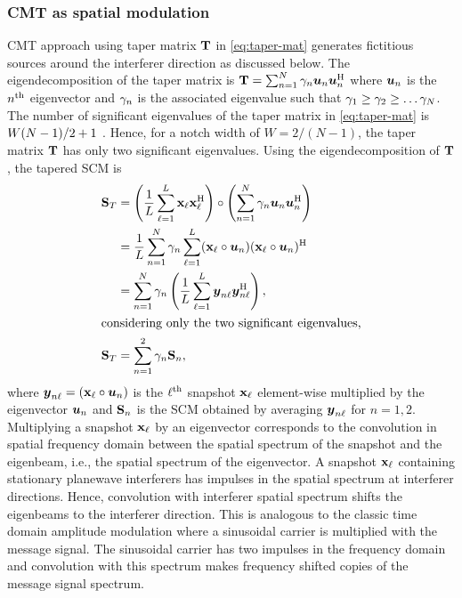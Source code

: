\subsubsection{CMT as spatial modulation}
\label{sec:cmt-as-spatial}
CMT approach using taper matrix $\mathbf{T}$ in \eqref{eq:taper-mat}
generates fictitious sources around the interferer direction as
discussed below. The eigendecomposition of the taper matrix is
$\mathbf{T} = \sum_{n=1}^{N}\gamma_n\boldsymbol{u}_n\boldsymbol{u}_n^{\rm H}$ where
$\boldsymbol{u}_n$ is the $n^{\rm th}$ eigenvector and $\gamma_n$ is the
associated eigenvalue such that
$\gamma_1 \geq \gamma_2 \geq \ldots \gamma_N$. The number of significant
eigenvalues of the taper matrix in \eqref{eq:taper-mat} is
$W(N-1)/2 + 1$ \cite{song2003null}. Hence, for a notch width of
$W = 2/(N-1)$, the taper matrix $\mathbf{T}$ has only two significant
eigenvalues. Using the eigendecomposition of $\mathbf{T}$, the tapered
SCM is
\begin{align*}
  {\bf S}_{T} &= \left( \frac{1}{L}\sum\limits_{\ell = 1}^{L}{\bf x}_{\ell}{\bf x}_{\ell}^{\rm H} \right) \circ \left( \sum\limits_{n=1}^{N}\gamma_n\boldsymbol{u}_n\boldsymbol{u}_n^{\rm H} \right)\\
 \
 &= \frac{1}{L}\sum\limits_{n=1}^{N}\gamma_n\sum\limits_{\ell = 1}^{L}({\bf x}_{\ell}\circ\boldsymbol{u}_n)({\bf x}_{\ell}\circ\boldsymbol{u}_n)^{\rm H}\\
               &=
               \sum\limits_{n=1}^{N}\gamma_n\left(\frac{1}{L}\sum\limits_{\ell
                 = 1}^{L}\boldsymbol{y}_{n\ell}\boldsymbol{y}_{n\ell}^{\rm H} \right ), \\
\intertext{considering only the two significant eigenvalues,}
{\bf S}_{T}  &= \sum\limits_{n=1}^{2}\gamma_n{\bf S}_n,
\end{align*}
where $\boldsymbol{y}_{n\ell} = ({\bf x}_{\ell}\circ\boldsymbol{u}_n)$ is the
$\ell^{\rm th}$ snapshot ${\bf x}_{\ell}$ element-wise multiplied by the
eigenvector $\boldsymbol{u}_n$ and ${\bf S}_n$ is the SCM obtained by
averaging $\boldsymbol{y}_{n\ell}$ for $n = 1, 2$. Multiplying a snapshot
${\bf x}_{\ell}$ by an eigenvector corresponds to the convolution in
spatial frequency domain between the spatial spectrum of the snapshot
and the eigenbeam, i.e., the spatial spectrum of the eigenvector. A
snapshot ${\bf x}_{\ell}$ containing stationary planewave interferers
has impulses in the spatial spectrum at interferer directions. Hence,
convolution with interferer spatial spectrum shifts the eigenbeams to
the interferer direction. This is analogous to the classic time domain
amplitude modulation where a sinusoidal carrier is multiplied with the
message signal. The sinusoidal carrier has two impulses in the
frequency domain and convolution with this spectrum makes frequency
shifted copies of the message signal spectrum.

